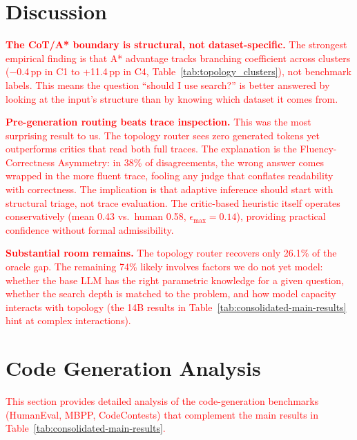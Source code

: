 \documentclass[11pt]{article}
\begin{document}
{\section{Discussion}
\label{sec:discussion}


\textcolor{red}{\textbf{The CoT/A* boundary is structural, not dataset-specific.}}
\textcolor{red}{The strongest empirical finding is that A* advantage tracks branching coefficient across clusters ($-$0.4\,pp in C1 to +11.4\,pp in C4, Table~\ref{tab:topology_clusters}), not benchmark labels. This means the question ``should I use search?'' is better answered by looking at the input's structure than by knowing which dataset it comes from.}

\textcolor{red}{\textbf{Pre-generation routing beats trace inspection.}}
\textcolor{red}{This was the most surprising result to us. The topology router sees zero generated tokens yet outperforms critics that read both full traces. The explanation is the Fluency-Correctness Asymmetry: in 38\% of disagreements, the wrong answer comes wrapped in the more fluent trace, fooling any judge that conflates readability with correctness. The implication is that adaptive inference should start with structural triage, not trace evaluation. The critic-based heuristic itself operates conservatively (mean 0.43 vs.\ human 0.58, $\epsilon_{\max}=0.14$), providing practical confidence without formal admissibility.}

\textcolor{red}{\textbf{Substantial room remains.}}
\textcolor{red}{The topology router recovers only 26.1\% of the oracle gap. The remaining 74\% likely involves factors we do not yet model: whether the base LLM has the right parametric knowledge for a given question, whether the search depth is matched to the problem, and how model capacity interacts with topology (the 14B results in Table~\ref{tab:consolidated-main-results} hint at complex interactions).}






{
\section{Code Generation Analysis}
\label{app:code_generation}

\textcolor{red}{This section provides detailed analysis of the code-generation benchmarks (HumanEval, MBPP, CodeContests) that complement the main results in Table~\ref{tab:consolidated-main-results}.}

}}
\end{document}
